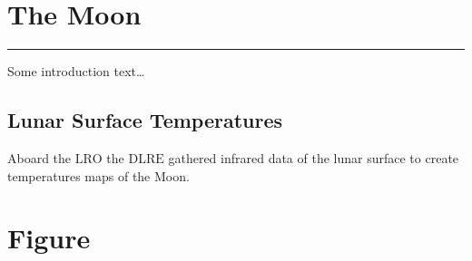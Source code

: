 \documentclass[
    fontsize=10pt,
    twoside=off,
    english,
]{scrbook}
\numberwithin{equation}{chapter}
\theoremstyle{break}
\theoremstyle{nonumberplain}
\begin{document}
\hypertarget{meta-title}{%
\section{The Moon}\label{meta-title}}

\begin{center}\rule{0.5\linewidth}{0.5pt}\end{center}

Some introduction text\ldots{}

\hypertarget{lunar-surface-temperatures}{%
\subsection{Lunar Surface
Temperatures}\label{lunar-surface-temperatures}}

Aboard the \(\mathrm{LRO}\) the \(\mathrm{DLRE}\) gathered infrared data
of the lunar surface to create temperatures maps of the Moon.

\section{Figure}
\end{document}
